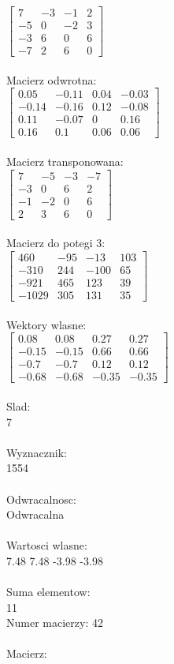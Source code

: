 \documentclass[a4paper,12pt]{article}
\begin{document}
$\begin{bmatrix} 7&-3&-1&2\\-5&0&-2&3\\-3&6&0&6\\-7&2&6&0 \end{bmatrix}$
\\
\\
Macierz odwrotna:\\

$\begin{bmatrix} 0.05&-0.11&0.04&-0.03\\-0.14&-0.16&0.12&-0.08\\0.11&-0.07&0&0.16\\0.16&0.1&0.06&0.06 \end{bmatrix}$
\\
\\
Macierz transponowana:\\

$\begin{bmatrix} 7&-5&-3&-7\\-3&0&6&2\\-1&-2&0&6\\2&3&6&0 \end{bmatrix}$
\\
\\
Macierz do potegi 3:\\

$\begin{bmatrix} 460&-95&-13&103\\-310&244&-100&65\\-921&465&123&39\\-1029&305&131&35 \end{bmatrix}$
\\
\\
Wektory wlasne:\\

$\begin{bmatrix} 0.08&0.08&0.27&0.27\\-0.15&-0.15&0.66&0.66\\-0.7&-0.7&0.12&0.12\\-0.68&-0.68&-0.35&-0.35 \end{bmatrix}$
\\
\\
Slad:\\
7
\\
\\
Wyznacznik:\\
1554
\\
\\
Odwracalnosc:\\
Odwracalna
\\
\\
Wartosci wlasne:\\
7.48 7.48 -3.98 -3.98
\\
\\
Suma elementow:\\
11
\\
\newpage
Numer macierzy:
42
\\
\\
Macierz:\\
\end{document}
